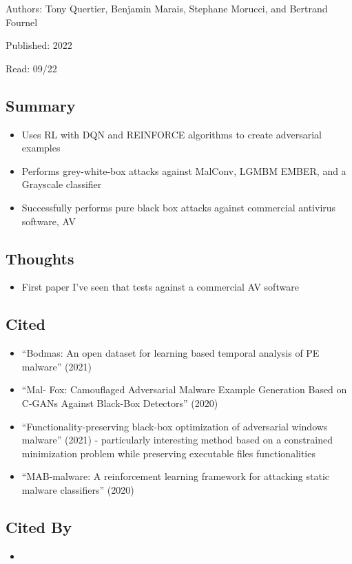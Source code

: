 \documentclass{article}
\begin{document}
\noindent Authors: Tony Quertier, Benjamin Marais, Stephane Morucci, and Bertrand Fournel

\noindent Published: 2022

\noindent Read: 09/22

\subsection*{Summary}
\begin{itemize}
	\item Uses RL with DQN and REINFORCE algorithms to create adversarial examples
	\item Performs grey-white-box attacks against MalConv, LGMBM EMBER, and a Grayscale classifier
	\item Successfully performs pure black box attacks against commercial antivirus software, AV
\end{itemize}

\subsection*{Thoughts}
\begin{itemize}
	\item First paper I've seen that tests against a commercial AV software
\end{itemize}

\subsection*{Cited}
\begin{itemize}
	\item ``Bodmas: An open dataset for learning based temporal analysis of PE malware'' (2021)
	\item ``Mal- Fox: Camouflaged Adversarial Malware Example Generation Based on C-GANs Against Black-Box Detectors'' (2020)
	\item ``Functionality-preserving black-box optimization of adversarial windows malware'' (2021) - particularly interesting method based on a constrained minimization problem while preserving executable files functionalities
	\item ``MAB-malware: A reinforcement learning framework for attacking static malware classifiers'' (2020)
\end{itemize}

\subsection*{Cited By}
\begin{itemize}
	\item
\end{itemize}
\end{document}

